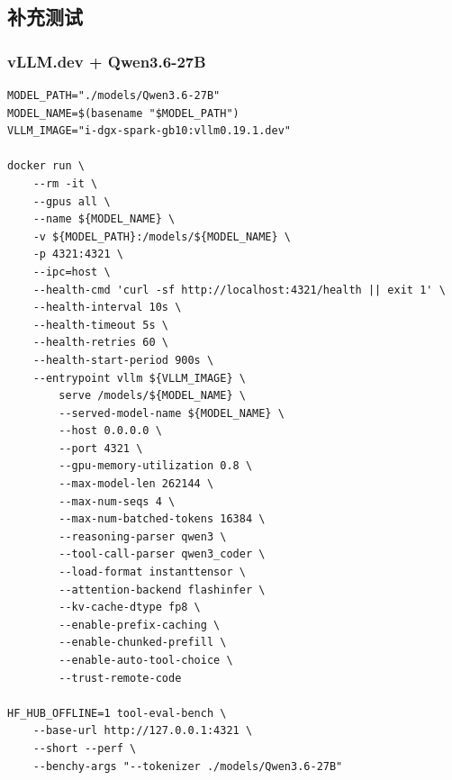 \documentclass{article}
\begin{document}
\subsection{补充测试}
\subsubsection{vLLM.dev + Qwen3.6-27B}
\begin{lstlisting}
MODEL_PATH="./models/Qwen3.6-27B"
MODEL_NAME=$(basename "$MODEL_PATH")
VLLM_IMAGE="i-dgx-spark-gb10:vllm0.19.1.dev"

docker run \
    --rm -it \
    --gpus all \
    --name ${MODEL_NAME} \
    -v ${MODEL_PATH}:/models/${MODEL_NAME} \
    -p 4321:4321 \
    --ipc=host \
    --health-cmd 'curl -sf http://localhost:4321/health || exit 1' \
    --health-interval 10s \
    --health-timeout 5s \
    --health-retries 60 \
    --health-start-period 900s \
    --entrypoint vllm ${VLLM_IMAGE} \
        serve /models/${MODEL_NAME} \
        --served-model-name ${MODEL_NAME} \
        --host 0.0.0.0 \
        --port 4321 \
        --gpu-memory-utilization 0.8 \
        --max-model-len 262144 \
        --max-num-seqs 4 \
        --max-num-batched-tokens 16384 \
        --reasoning-parser qwen3 \
        --tool-call-parser qwen3_coder \
        --load-format instanttensor \
        --attention-backend flashinfer \
        --kv-cache-dtype fp8 \
        --enable-prefix-caching \
        --enable-chunked-prefill \
        --enable-auto-tool-choice \
        --trust-remote-code

HF_HUB_OFFLINE=1 tool-eval-bench \
    --base-url http://127.0.0.1:4321 \
    --short --perf \
    --benchy-args "--tokenizer ./models/Qwen3.6-27B"
\end{lstlisting}
\end{document}
